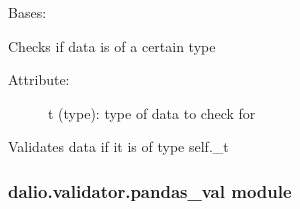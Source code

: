 \documentclass[letterpaper,10pt,english]{sphinxmanual}
\begin{document}
\begin{fulllineitems}
\label{\detokenize{dalio.validator:dalio.validator.base_val.IS_TYPE}}
Bases: {\hyperref[\detokenize{dalio.validator:dalio.validator.validator.Validator}]{}}

Checks if data is of a certain type
\begin{description}
\item[{Attribute:}] \leavevmode
t (type): type of data to check for

\end{description}

\begin{fulllineitems}
\label{\detokenize{dalio.validator:dalio.validator.base_val.IS_TYPE.validate}}
Validates data if it is of type self.\_t

\end{fulllineitems}


\end{fulllineitems}



\subsubsection{dalio.validator.pandas\_val module}
\label{\detokenize{dalio.validator:module-dalio.validator.pandas_val}}\label{\detokenize{dalio.validator:dalio-validator-pandas-val-module}}
\end{document}
